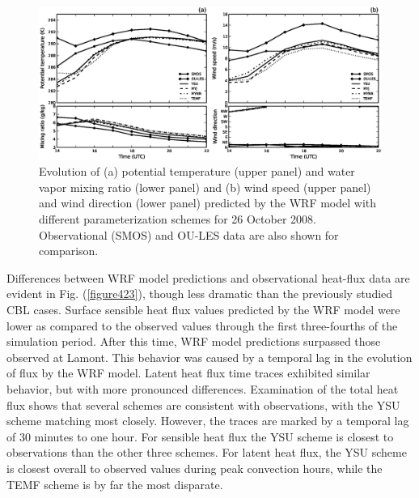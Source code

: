 \begin{figure}[ht!]
\begin{center}
\includegraphics[width=\textwidth]{figures/chapter4/meteogram_phys_20081026}
\end{center}
\caption{Evolution of (a) potential temperature (upper panel) and water vapor mixing ratio (lower panel) and (b) wind speed (upper panel) and wind direction (lower panel) predicted by the WRF model with different parameterization schemes for 26 October 2008. Observational (SMOS) and OU-LES data are also shown for comparison.}
\label{figure422}
\end{figure}


Differences between WRF model predictions and observational heat-flux data are evident in Fig. (\autoref{figure423}), though less dramatic than the previously studied CBL cases. Surface sensible heat flux values predicted by the WRF model were lower as compared to the observed values through the first three-fourths of the simulation period. After this time, WRF model predictions surpassed those observed at Lamont. This behavior was caused by a temporal lag in the evolution of flux by the WRF model. Latent heat flux time traces exhibited similar behavior, but with more pronounced differences. Examination of the total heat flux shows that several schemes are consistent with observations, with the YSU scheme matching most closely. However, the traces are marked by a temporal lag of $30$ minutes to one hour. For sensible heat flux the YSU scheme is closest to observations than the other three schemes. For latent heat flux, the YSU scheme is closest overall to observed values during peak convection hours, while the TEMF scheme is by far the most disparate. 


